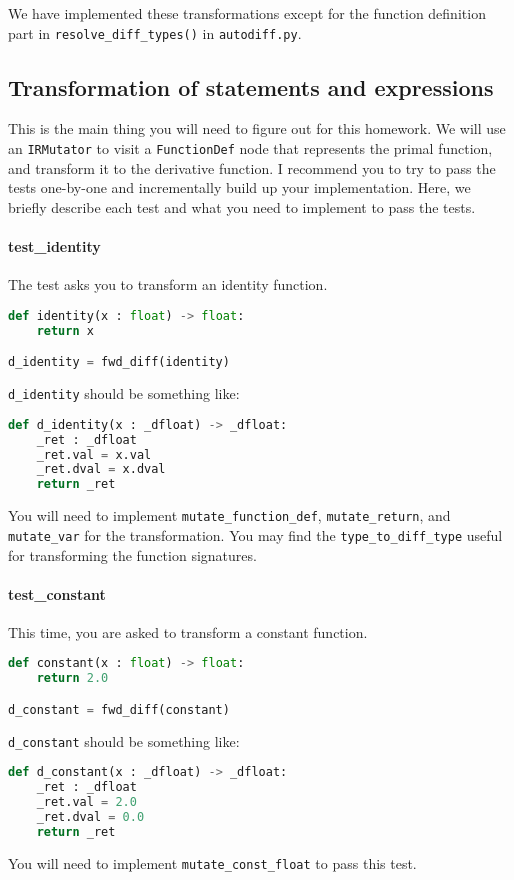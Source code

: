We have implemented these transformations except for the function definition part in \lstinline{resolve_diff_types()} in \lstinline{autodiff.py}.

\subsection{Transformation of statements and expressions}
This is the main thing you will need to figure out for this homework. We will use an \lstinline{IRMutator} to visit a \lstinline{FunctionDef} node that represents the primal function, and transform it to the derivative function. I recommend you to try to pass the tests one-by-one and incrementally build up your implementation. Here, we briefly describe each test and what you need to implement to pass the tests.

\paragraph{test_identity} The test asks you to transform an identity function.
\begin{lstlisting}[language=Python]
def identity(x : float) -> float:
    return x

d_identity = fwd_diff(identity)
\end{lstlisting}
\lstinline{d_identity} should be something like:
\begin{lstlisting}[language=Python]
def d_identity(x : _dfloat) -> _dfloat:
	_ret : _dfloat
	_ret.val = x.val
	_ret.dval = x.dval
	return _ret
\end{lstlisting}
You will need to implement \lstinline{mutate_function_def}, \lstinline{mutate_return}, and \lstinline{mutate_var} for the transformation. You may find the \lstinline{type_to_diff_type} useful for transforming the function signatures. 

\paragraph{test_constant} This time, you are asked to transform a constant function.
\begin{lstlisting}[language=Python]
def constant(x : float) -> float:
    return 2.0

d_constant = fwd_diff(constant)
\end{lstlisting}
\lstinline{d_constant} should be something like:
\begin{lstlisting}[language=Python]
def d_constant(x : _dfloat) -> _dfloat:
	_ret : _dfloat
	_ret.val = 2.0
	_ret.dval = 0.0
	return _ret
\end{lstlisting}
You will need to implement \lstinline{mutate_const_float} to pass this test.

